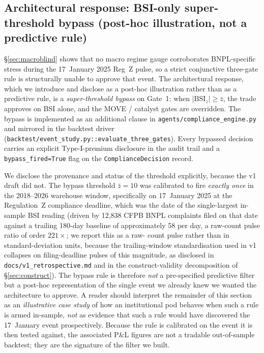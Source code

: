 \documentclass[11pt,letterpaper]{article}
\newcommand{\bsi}{\text{BSI}}
\begin{document}
\subsection{Architectural response: BSI-only super-threshold bypass
(post-hoc illustration, not a predictive rule)}
\label{sec:blindspot}

\S\ref{sec:macroblind} shows that no macro regime gauge corroborates
BNPL-specific stress during the 17~January 2025 Reg~Z pulse, so a
strict conjunctive three-gate rule is structurally unable to approve
that event. The architectural response, which we introduce and disclose
as a post-hoc illustration rather than as a predictive rule, is a
\emph{super-threshold bypass} on Gate~1: when $|\bsi_z| \geq \bar{z}$,
the trade approves on BSI alone, and the MOVE / catalyst gates are
overridden. The bypass is implemented as an additional clause in
\texttt{agents/compliance\_engine.py} and mirrored in the backtest
driver (\texttt{backtest/event\_study.py::evaluate\_three\_gates}).
Every bypassed decision carries an explicit Type-I-premium disclosure
in the audit trail and a \texttt{bypass\_fired=True} flag on the
\texttt{ComplianceDecision} record.

We disclose the provenance and status of the threshold explicitly,
because the v1 draft did not. The bypass threshold $\bar{z}=10$ was
calibrated to fire \emph{exactly once} in the 2018--2026 warehouse
window, specifically on 17~January 2025 at the Regulation~Z compliance
deadline, which was the date of the single-largest in-sample BSI
reading (driven by 12{,}838 CFPB BNPL complaints filed on that date
against a trailing 180-day baseline of approximately 58 per day, a
raw-count pulse ratio of order $221\times$; we report this as a raw-
count pulse rather than in standard-deviation units, because the
trailing-window standardisation used in v1 collapses on filing-deadline
pulses of this magnitude, as disclosed in
\texttt{docs/v1\_retrospective.md} and in the construct-validity
decomposition of \S\ref{sec:construct}). The bypass rule is therefore \emph{not}
a pre-specified predictive filter but a post-hoc representation of
the single event we already knew we wanted the architecture to
approve. A reader should interpret the remainder of this section as
an \emph{illustrative case study} of how an institutional pod
behaves when such a rule is armed in-sample, \emph{not} as evidence
that such a rule would have discovered the 17~January event
prospectively. Because the rule is calibrated on the event it is
then tested against, the associated P\&L figures are not a tradable
out-of-sample backtest; they are the signature of the filter we
built.
\end{document}
